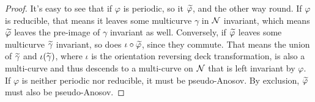 \begin{proof}
  It's easy to see that if $\varphi$ is periodic, so it $\widetilde{\varphi}$, and the other way round.
  If $\varphi$ is reducible, that means it leaves some multicurve $\gamma$ in $\mathcal{N}$ invariant, which means $\widetilde{\varphi}$ leaves the pre-image of $\gamma$ invariant as well.
  Conversely, if $\widetilde{\varphi}$ leaves some multicurve $\widetilde{\gamma}$ invariant, so does $\iota \circ \widetilde{\varphi}$, since they commute.
  That means the union of $\widetilde{\gamma}$ and $\iota(\widetilde{\gamma})$, where $\iota$ is the orientation reversing deck transformation, is also a multi-curve and thus descends to a multi-curve on $\mathcal{N}$ that is left invariant by $\varphi$.
  If $\varphi$ is neither periodic nor reducible, it must be pseudo-Anosov.  By exclusion, $\widetilde{\varphi}$ must also be pseudo-Anosov.


\end{proof}

